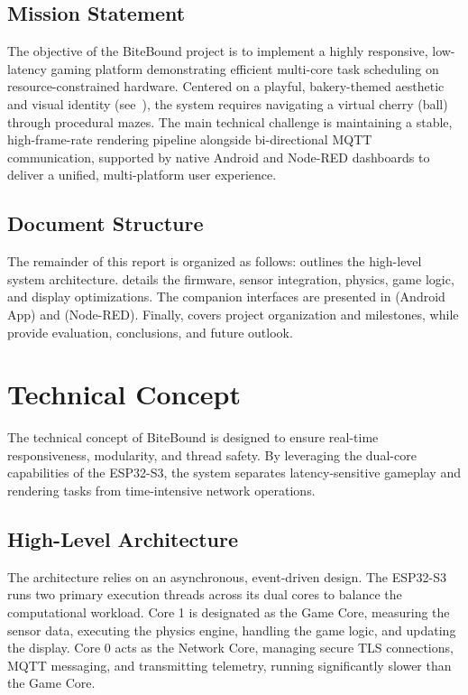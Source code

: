 \documentclass[10pt,journal,final,a4paper]{IEEEtran}
\begin{document}
\subsection{Mission Statement}
\label{subsec:mission_statement}
The objective of the BiteBound project is to implement a highly responsive, low-latency gaming platform demonstrating efficient multi-core task scheduling on resource-constrained hardware. Centered on a playful, bakery-themed aesthetic and visual identity (see~), the system requires navigating a virtual cherry (ball) through procedural mazes. The main technical challenge is maintaining a stable, high-frame-rate rendering pipeline alongside bi-directional MQTT communication, supported by native Android and Node-RED dashboards to deliver a unified, multi-platform user experience.

\subsection{Document Structure}
\label{subsec:document_structure}
The remainder of this report is organized as follows:
 outlines the high-level system architecture.
 details the firmware, sensor integration, physics, game logic, and display optimizations.
The companion interfaces are presented in  (Android App) and  (Node-RED).
Finally,  covers project organization and milestones, while  provide evaluation, conclusions, and future outlook.

\section{Technical Concept}
\label{sec:technical_concept}

The technical concept of BiteBound is designed to ensure real-time responsiveness, modularity, and thread safety. By leveraging the dual-core capabilities of the ESP32-S3, the system separates latency-sensitive gameplay and rendering tasks from time-intensive network operations.

\subsection{High-Level Architecture}
\label{subsec:high_level_architecture}

The architecture relies on an asynchronous, event-driven design. The ESP32-S3 runs two primary execution threads across its dual cores to balance the computational workload. Core 1 is designated as the Game Core, measuring the sensor data, executing the physics engine, handling the game logic, and updating the display. Core 0 acts as the Network Core, managing secure TLS connections, MQTT messaging, and transmitting telemetry, running significantly slower than the Game Core.
\end{document}
